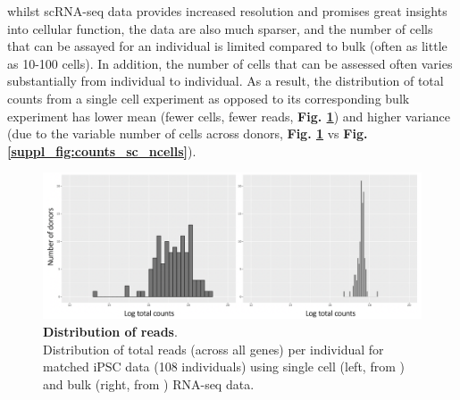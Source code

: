 whilst scRNA-seq data provides increased resolution and promises great insights into cellular function, the data are also much sparser, and the number of cells that can be assayed for an individual is limited compared to bulk (often as little as 10-100 cells). 
In addition, the number of cells that can be assessed often varies substantially from individual to individual.
As a result, the distribution of total counts from a single cell experiment as opposed to its corresponding bulk experiment has lower mean (fewer cells, fewer reads, \textbf{Fig. \ref{fig:sc_bulk_counts}}) and higher variance (due to the variable number of cells across donors, \textbf{Fig. \ref{fig:sc_bulk_counts}} vs \textbf{Fig. \ref{suppl_fig:counts_sc_ncells}}).

\begin{figure}[h]
\centering
\includegraphics[width=13cm]{Chapter3/Fig/count_distribution_sc_vs_bulk.png}
\caption[Distribution of reads]{\textbf{Distribution of reads}.\\
Distribution of total reads (across all genes) per individual for matched 
iPSC
data (108 individuals) using single cell (left, from \cite{cuomo2020single}) and bulk (right, from \cite{mirauta2018population}) RNA-seq data.}
\label{fig:sc_bulk_counts}
\end{figure}


